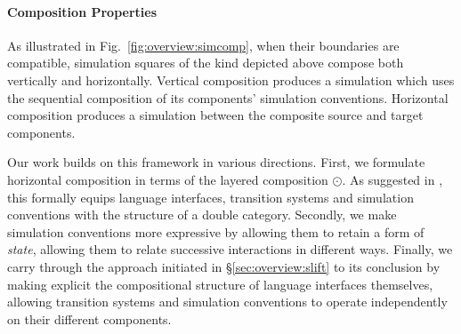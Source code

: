 \documentclass[acmsmall,screen,review,anonymous]{acmart}
\begin{document}
\paragraph{Composition Properties} \label{sec:overview:doublecat} %

As illustrated in Fig.~\ref{fig:overview:simcomp},
when their boundaries are compatible,
simulation squares of the kind depicted above compose both
vertically and horizontally.
Vertical composition produces a simulation
which uses the sequential composition
of its components' simulation conventions.
Horizontal composition produces a simulation
between the composite source and target components.

Our work builds on this framework in various directions.
First,
we formulate horizontal composition in terms of
the layered composition $\odot$.
As suggested in \citet{compcerto},
this formally equips language interfaces,
transition systems and
simulation conventions
with the structure of a double category.
Secondly,
we make simulation conventions more expressive
by allowing them to retain a form of \emph{state},
allowing them to relate successive interactions
in different ways.
Finally,
we carry through the approach initiated in \S\ref{sec:overview:slift}
to its conclusion
by making explicit the compositional structure of
language interfaces themselves,
allowing transition systems and simulation conventions
to operate independently on their different components.

\end{document}
